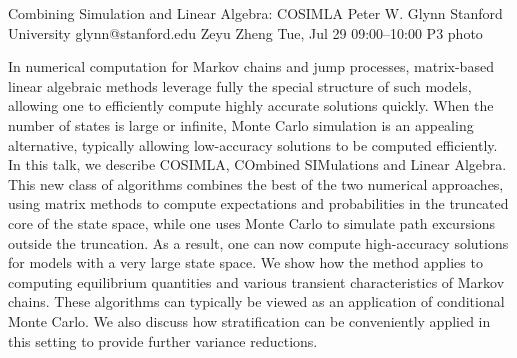\clearpage
\begin{talk}
  {Combining Simulation and Linear Algebra: COSIMLA}%
  {Peter W. Glynn}%
  {Stanford University}%
  {glynn@stanford.edu}%
  {Zeyu Zheng}%
  {}%
  {Tue, Jul 29 09:00--10:00}%
  {P3}%
  {photo}%
  
    
   
In numerical computation for Markov chains and jump processes, matrix-based linear algebraic methods leverage fully the special structure of such models, allowing one to efficiently compute highly accurate solutions quickly. When the number of states is large or infinite, Monte Carlo simulation is an appealing alternative, typically allowing low-accuracy solutions to be computed efficiently. In this talk, we describe COSIMLA, COmbined SIMulations and Linear Algebra. This new class of algorithms combines the best of the two numerical approaches, using matrix methods to compute expectations and probabilities in the truncated core of the state space, while one uses Monte Carlo to simulate path excursions outside the truncation. As a result, one can now compute high-accuracy solutions for models with a very large state space. We show how the method applies to computing equilibrium quantities and various transient characteristics of Markov chains. These algorithms can typically be viewed as an application of conditional Monte Carlo. We also discuss how stratification can be conveniently applied in this setting to provide further variance reductions.  

\end{talk}

